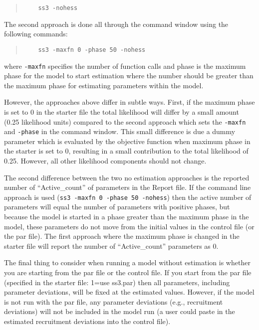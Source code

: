 \begin{quote}
	\begin{verbatim}
	ss3 -nohess
	\end{verbatim}
\end{quote}

The second approach is done all through the command window using the following commands:

\begin{quote}
	\begin{verbatim}
	ss3 -maxfn 0 -phase 50 -nohess
	\end{verbatim}
\end{quote}

where \texttt{-maxfn} specifies the number of function calls and phase is the maximum phase for the model to start estimation where the number should be greater than the maximum phase for estimating parameters within the model. 

However, the approaches above differ in subtle ways. First, if the maximum phase is set to 0 in the starter file the total likelihood will differ by a small amount (0.25 likelihood units) compared to the second approach which sets the \texttt{-maxfn} and \texttt{-phase} in the command window. This small difference is due a dummy parameter which is evaluated by the objective function when maximum phase in the starter is set to 0, resulting in a small contribution to the total likelihood of 0.25. However, all other likelihood components should not change.  

The second difference between the two no estimation approaches is the reported number of ``Active\_count'' of parameters in the Report file. If the command line approach is used (\texttt{ss3 -maxfn 0 -phase 50 -nohess}) then the active number of parameters will equal the number of parameters with positive phases, but because the model is started in a phase greater than the maximum phase in the model, these parameters do not move from the initial values in the control file (or the par file). The first approach where the maximum phase is changed in the starter file will report the number of ``Active\_count'' parameters as 0.  

The final thing to consider when running a model without estimation is whether you are starting from the par file or the control file. If you start from the par file (specified in the starter file: 1=use ss3.par) then all parameters, including parameter deviations, will be fixed at the estimated values. However, if the model is not run with the par file, any parameter deviations (e.g., recruitment deviations) will not be included in the model run (a user could paste in the estimated recruitment deviations into the control file). 

